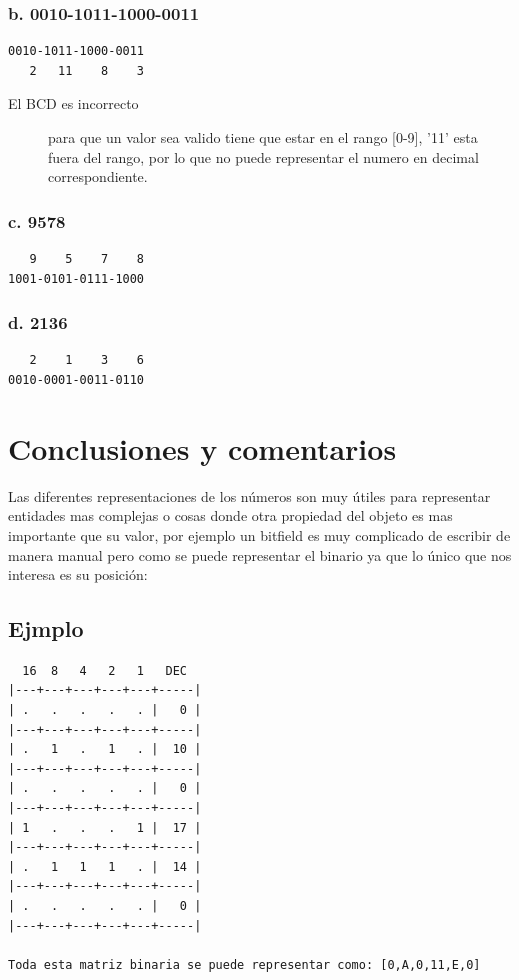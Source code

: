 \documentclass[12pt]{article}
\begin{document}
\subsubsection*{b. 0010-1011-1000-0011}
\label{sec:org677868b}
\begin{verbatim}
0010-1011-1000-0011
   2   11    8    3
\end{verbatim}

\begin{description}
\item[{El BCD es incorrecto}] para que un valor sea valido tiene que estar en el rango [0-9], '11' esta fuera del rango, por lo que no puede representar el numero en decimal correspondiente.
\end{description}

\subsubsection*{c. 9578}
\label{sec:orgca8f7b1}
\begin{verbatim}
   9    5    7    8
1001-0101-0111-1000 
\end{verbatim}

\subsubsection*{d. 2136}
\label{sec:org0e9719d}
\begin{verbatim}
   2    1    3    6
0010-0001-0011-0110
\end{verbatim}

\section*{Conclusiones y comentarios}
\label{sec:orgb281da2}
Las diferentes representaciones de los números son muy útiles para representar entidades mas complejas o cosas donde otra propiedad del objeto es mas importante que su valor, por ejemplo un bitfield es muy complicado de escribir de manera manual pero como se puede representar el binario ya que lo único que nos interesa es su posición:

\subsection*{Ejmplo}
\label{sec:orgbbfa9c8}
\begin{verbatim}
  16  8   4   2   1   DEC 
|---+---+---+---+---+-----|
| .   .   .   .   . |   0 |
|---+---+---+---+---+-----|
| .   1   .   1   . |  10 |
|---+---+---+---+---+-----|
| .   .   .   .   . |   0 |
|---+---+---+---+---+-----|
| 1   .   .   .   1 |  17 |
|---+---+---+---+---+-----|
| .   1   1   1   . |  14 |
|---+---+---+---+---+-----|
| .   .   .   .   . |   0 |
|---+---+---+---+---+-----|

Toda esta matriz binaria se puede representar como: [0,A,0,11,E,0]
\end{verbatim}
\end{document}
